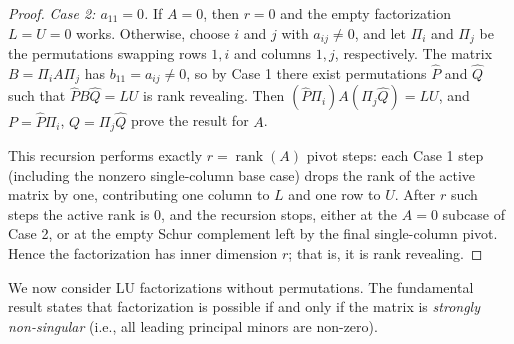 \documentclass[final]{siamart1116}
\numberwithin{theorem}{section}
\DeclareMathOperator{\rk}{rank}
\begin{document}
\begin{proof}
  \emph{Case 2: $a_{11} = 0$.} If $A = 0$, then $r = 0$ and the empty factorization $L = U = 0$ works. Otherwise, choose $i$ and $j$ with $a_{ij} \neq 0$, and let $\Pi_i$ and $\Pi_j$ be the permutations swapping rows $1, i$ and columns $1, j$, respectively. The matrix $B = \Pi_i A \Pi_j$ has $b_{11} = a_{ij} \neq 0$, so by Case 1 there exist permutations $\widehat{P}$ and $\widehat{Q}$ such that $\widehat{P} B \widehat{Q} = LU$ is rank revealing. Then $(\widehat{P} \Pi_i) A (\Pi_j \widehat{Q}) = LU$, and $P = \widehat{P} \Pi_i$, $Q = \Pi_j \widehat{Q}$ prove the result for $A$.

  This recursion performs exactly $r=\rk(A)$ pivot steps: each Case 1 step (including the nonzero single-column base case) drops the rank of the active matrix by one, contributing one column to $L$ and one row to $U$. After $r$ such steps the active rank is $0$, and the recursion stops, either at the $A=0$ subcase of Case 2, or at the empty Schur complement left by the final single-column pivot. Hence the factorization has inner dimension $r$; that is, it is rank revealing.
\end{proof}

We now consider LU factorizations without permutations. The fundamental result states that factorization is possible if and only if the matrix is \emph{strongly non-singular} (i.e., all leading principal minors are non-zero).

\end{document}
